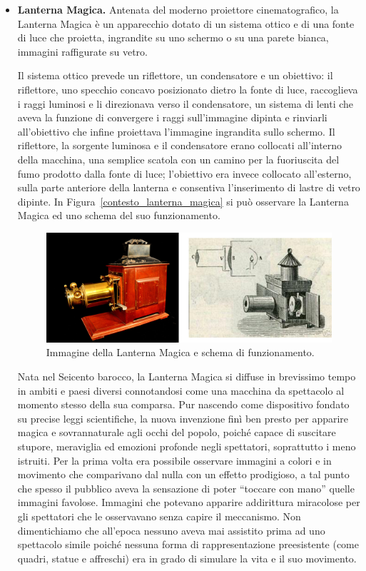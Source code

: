 \begin{itemize}
	\item \textbf{Lanterna Magica.}
	\label{contesto_lanterna_magica}
	Antenata del moderno proiettore cinematografico, la Lanterna Magica è un apparecchio dotato di un sistema ottico e di una fonte di luce che proietta, ingrandite su uno schermo o su una parete bianca, immagini raffigurate su vetro.
	
	Il sistema ottico prevede un riflettore, un condensatore e un obiettivo: il riflettore, uno specchio concavo posizionato dietro la fonte di luce, raccoglieva i raggi luminosi e li direzionava verso il condensatore, un sistema di lenti che aveva la funzione di convergere i raggi sull’immagine dipinta e rinviarli all’obiettivo che infine proiettava l’immagine ingrandita sullo schermo.
	Il riflettore, la sorgente luminosa e il condensatore erano collocati all’interno della macchina, una semplice scatola con un camino per la fuoriuscita del fumo prodotto dalla fonte di luce; l’obiettivo era invece collocato all’esterno, sulla parte anteriore della lanterna e consentiva l’inserimento di lastre di vetro dipinte.
	In Figura~\ref{contesto_lanterna_magica} si può osservare la Lanterna Magica ed uno schema del suo funzionamento.
	
		\begin{figure}%
			\centering
			\includegraphics[width= 0.8\columnwidth]{images/contestoRiferimento/02_lanterna.jpg}
			\caption{Immagine della Lanterna Magica e schema di funzionamento.}
			\label{fig:contesto_riferimento_lanterna_magica}
		\end{figure}
	
	Nata nel Seicento barocco, la Lanterna Magica si diffuse in brevissimo tempo in ambiti e paesi diversi connotandosi come una macchina da spettacolo al momento stesso della sua comparsa. Pur nascendo come dispositivo fondato su precise leggi scientifiche, la nuova invenzione finì ben presto per apparire magica e sovrannaturale agli occhi del popolo, poiché capace di suscitare stupore, meraviglia ed emozioni profonde negli spettatori, soprattutto i meno istruiti. Per la prima volta era possibile osservare immagini a colori e in movimento che comparivano dal nulla con un effetto prodigioso, a tal punto che spesso il pubblico aveva la sensazione di poter “toccare con mano” quelle immagini favolose. Immagini che potevano apparire addirittura miracolose per gli spettatori che le osservavano senza capire il meccanismo. Non dimentichiamo che all’epoca nessuno aveva mai assistito prima ad uno spettacolo simile poiché nessuna forma di rappresentazione preesistente (come quadri, statue e affreschi) era in grado di simulare la vita e il suo movimento.
	

\end{itemize}
